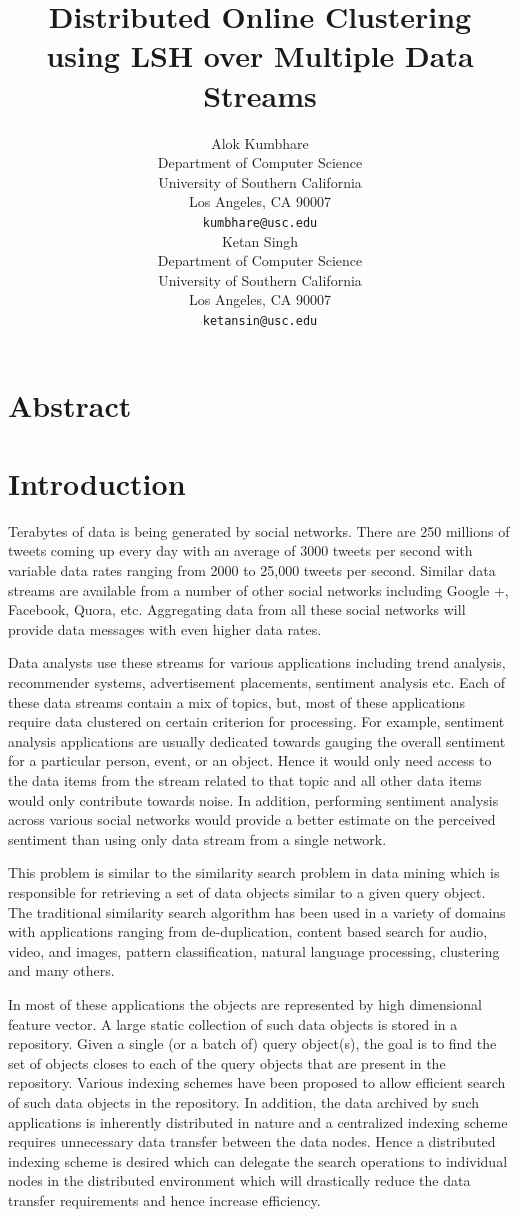 \documentclass{article} %
\title{Distributed Online Clustering using LSH over Multiple Data Streams}
\author{
Alok Kumbhare \\
Department of Computer Science \\
University of Southern California \\
Los Angeles, CA 90007 \\
\texttt{kumbhare@usc.edu} \\
\And
Ketan Singh \\
Department of Computer Science \\
University of Southern California \\
Los Angeles, CA 90007 \\
\texttt{ketansin@usc.edu} \\
}
\begin{document}
\maketitle

\section{Abstract}

\section{Introduction}
Terabytes of data is being generated by social networks. There are 250 millions of tweets coming up every day with an average of 3000 tweets per second  with variable data rates ranging from 2000 to 25,000 tweets per second. Similar data streams are available from a number of other social networks including Google +, Facebook, Quora, etc.  Aggregating data from all these social networks will provide data messages with even higher data rates. 

Data analysts use these streams for various applications including trend analysis, recommender systems, advertisement placements, sentiment analysis etc. Each of these data streams contain a mix of topics, but, most of these applications require data clustered on certain criterion for processing. For example, sentiment analysis applications are usually dedicated towards gauging the overall sentiment for a particular person, event, or an object. Hence it would only need access to the data items from the stream related to that topic and all other data items would only contribute towards noise. In addition, performing sentiment analysis across various social networks would provide a better  estimate on the perceived  sentiment than using only data stream from a single network.

This problem is similar to the similarity search problem in data mining which is responsible for retrieving a set of data objects similar to a given query object. The traditional similarity search algorithm has been used in a variety of domains with applications ranging from de-duplication, content based search for audio, video, and images, pattern classification, natural language processing, clustering and many others. 

In most of these applications the objects are represented by high dimensional feature vector. A large static collection of such data objects is stored in a repository. Given a single (or a batch of) query object(s), the goal is to find the set of objects closes to each of the query objects that are present in the repository. Various indexing schemes have been proposed to allow efficient search of such data objects in the repository. In addition, the data archived by such applications is inherently distributed in nature and a centralized indexing scheme requires unnecessary data transfer between the data nodes. Hence a distributed indexing scheme is desired which can delegate the search operations to individual nodes in the distributed environment which will drastically reduce the data transfer requirements and hence increase efficiency.
\end{document}
